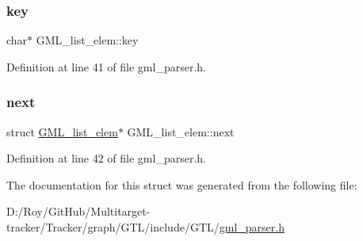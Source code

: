 \subsubsection{\texorpdfstring{key}{key}}
{\footnotesize\ttfamily char$\ast$ G\+M\+L\+\_\+list\+\_\+elem\+::key}



Definition at line 41 of file gml\+\_\+parser.\+h.

\mbox{\label{struct_g_m_l__list__elem_a5e115c6cb92bf1b9e01e4e3500573635}} 
\subsubsection{\texorpdfstring{next}{next}}
{\footnotesize\ttfamily struct \mbox{\hyperlink{struct_g_m_l__list__elem}{G\+M\+L\+\_\+list\+\_\+elem}}$\ast$ G\+M\+L\+\_\+list\+\_\+elem\+::next}



Definition at line 42 of file gml\+\_\+parser.\+h.



The documentation for this struct was generated from the following file\+:\begin{DoxyCompactItemize}
\item 
D\+:/\+Roy/\+Git\+Hub/\+Multitarget-\/tracker/\+Tracker/graph/\+G\+T\+L/include/\+G\+T\+L/\mbox{\hyperlink{gml__parser_8h}{gml\+\_\+parser.\+h}}\end{DoxyCompactItemize}
